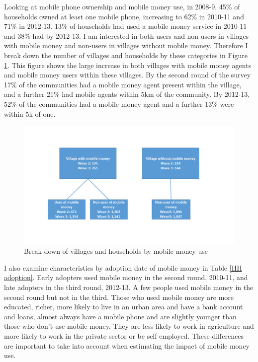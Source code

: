 Looking at mobile phone ownership and mobile money use,  in 2008-9, 45\% of households owned at least one mobile phone, increasing to 62\% in 2010-11 and 71\% in 2012-13. 13\% of households had used a mobile money service in 2010-11 and 38\% had by 2012-13. I am interested in both users and non users in villages with mobile money and non-users in villages without mobile money. Therefore I break down the number of villages and households by these categories in Figure \ref{fig:users chart}. This figure shows the large increase in both villages with mobile money agents and mobile money users within these villages. By the second round of the survey 17\% of the communities had a mobile money agent present within the village, and a further 21\% had mobile agents within 5km of the community. By 2012-13, 52\% of the communities had a mobile money agent and a further 13\% were within 5k of one.  
\begin{figure}
\centering
\includegraphics[width=\textwidth,trim= 0 3cm 0 3cm, clip=true, keepaspectratio]{users_chart_} 
\caption{Break down of villages and households by mobile money use} \label{fig:users chart}
\end{figure}

I also examine characteristics by adoption date of mobile money in Table \ref{HH adoption}. Early adopters used mobile money in the second round, 2010-11, and late adopters in the third round, 2012-13. A few people used mobile money in the second round but not in the third. Those who used mobile money are more educated, richer, more likely to live in an urban area and have a bank account and loans, almost always have a mobile phone and are slightly younger than those who don't use mobile money. They are less likely to work in agriculture and more likely to work in the private sector or be self employed. These differences are important to take into account when estimating the impact of mobile money use. 

